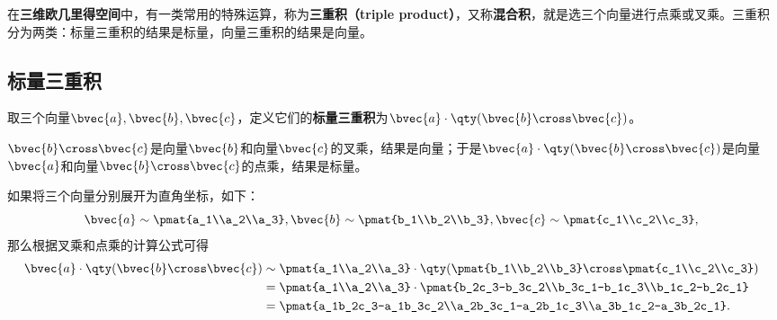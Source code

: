 




在\textbf{三维欧几里得空间}中，有一类常用的特殊运算，称为\textbf{三重积（triple product）}，又称\textbf{混合积}，就是选三个向量进行点乘或叉乘。三重积分为两类：标量三重积的结果是标量，向量三重积的结果是向量。




\subsection{标量三重积}


取三个向量$\bvec{a}, \bvec{b}, \bvec{c}$，定义它们的\textbf{标量三重积}为$\bvec{a}\cdot\qty(\bvec{b}\cross\bvec{c})$。

$\bvec{b}\cross\bvec{c}$是向量$\bvec{b}$和向量$\bvec{c}$的叉乘，结果是向量；于是$\bvec{a}\cdot\qty(\bvec{b}\cross\bvec{c})$是向量$\bvec{a}$和向量$\bvec{b}\cross\bvec{c}$的点乘，结果是标量。

如果将三个向量分别展开为直角坐标，如下：
\begin{equation}
\bvec{a}\sim\pmat{a_1\\a_2\\a_3}, \bvec{b}\sim\pmat{b_1\\b_2\\b_3}, \bvec{c}\sim\pmat{c_1\\c_2\\c_3}, ~
\end{equation}
那么根据叉乘和点乘的计算公式可得
\begin{equation}
\begin{aligned}
\bvec{a}\cdot\qty(\bvec{b}\cross\bvec{c}) \sim{}& \pmat{a_1\\a_2\\a_3}\cdot\qty(\pmat{b_1\\b_2\\b_3}\cross \pmat{c_1\\c_2\\c_3})\\
={}& \pmat{a_1\\a_2\\a_3}\cdot\pmat{b_2c_3-b_3c_2\\b_3c_1-b_1c_3\\b_1c_2-b_2c_1}\\
={}& \pmat{a_1b_2c_3-a_1b_3c_2\\a_2b_3c_1-a_2b_1c_3\\a_3b_1c_2-a_3b_2c_1}. 
\end{aligned}~
\end{equation}

